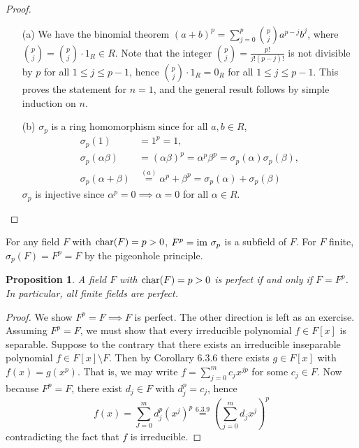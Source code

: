 \documentclass[11pt]{book}
\newcounter{counter}
\newtheorem{proposition}[counter]{Proposition}   \newtheorem{problem}[counter]{Problem}   \newtheorem*{proposition*}{Proposition}   \newtheorem*{lemma*}{Lemma}
\theoremstyle{definition}   \newtheorem{defn}[counter]{Definition} %
\newcommand{\bs}{\setminus}   \newcommand{\A}{\mathcal{A}}   \newcommand{\sy}{\textnormal{Syl}}   \newcommand{\size}[1]{\left| #1 \right|}
\newcommand{\vs}{\vspace{8pt}}
\numberwithin{counter}{chapter}
\begin{document}
\begin{proof}\ 
\begin{enumerate}
\item[(a)] We have the binomial theorem $(a+b)^p = \sum_{j=0}^p {p \choose j} a^{p-j} b^j$, where ${p \choose j} = {p \choose j} \cdot 1_R \in R$. Note that the integer ${p \choose j} = \frac{p!}{j!(p-j)!}$ is not divisible by $p$ for all $1 \leq j \leq p-1$, hence ${p \choose j} \cdot 1_R = 0_R$ for all $1 \leq j \leq p-1$. This proves the statement for $n = 1$, and the general result follows by simple induction on $n$. 

\item[(b)] $\sigma_p$ is a ring homomorphism since for all $a,b \in R$, 
\begin{align*}
\sigma_p(1) &= 1^p = 1, \\
\sigma_p(\alpha \beta) &= (\alpha \beta)^p = \alpha^p \beta^p = \sigma_p(\alpha) \sigma_p(\beta), \\
\sigma_p(\alpha + \beta) &\overset{(a)}{=} \alpha^p + \beta^p = \sigma_p(\alpha) + \sigma_p(\beta)
\end{align*}
$\sigma_p$ is injective since $\alpha^p = 0 \implies \alpha = 0$ for all $\alpha \in R$. 
\end{enumerate}
\end{proof}

\vs

\begin{remark}
For any field $F$ with $\textnormal{char}(F) = p > 0$, $F^p = \textnormal{im } \sigma_p$ is a subfield of $F$. For $F$ finite, $\sigma_p(F) = F^p = F$ by the pigeonhole principle. 
\end{remark}

\vs

\begin{proposition}
A field $F$ with $\textnormal{char}(F) = p > 0$ is perfect if and only if $F = F^p$. In particular, all finite fields are perfect. 
\end{proposition}

\begin{proof}
We show $F^p = F \implies F$ is perfect. The other direction is left as an exercise. Assuming $F^p = F$, we must show that every irreducible polynomial $f \in F[x]$ is separable. Suppose to the contrary that there exists an irreducible inseparable polynomial $f \in F[x] \bs F$. Then by Corollary 6.3.6 there exists $g \in F[x]$ with $f(x) = g(x^p)$. That is, we may write $f = \sum_{j=0}^m c_j x^{jp}$ for some $c_j \in F$. Now because $F^p = F$, there exist $d_j \in F$ with $d_j^p = c_j$, hence 
	\[f(x) = \sum_{J=0}^m d_j^p (x^j)^p \overset{6.3.9}{=} \left(\sum_{j=0}^m d_j x^j\right)^p \]
contradicting the fact that $f$ is irreducible. 
\end{proof}
\end{document}
